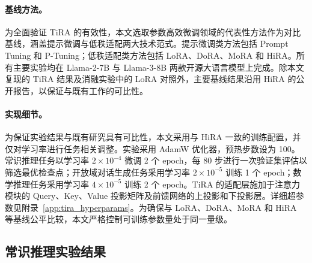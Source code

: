 \documentclass[UTF8,a4paper,11pt]{ctexart}
\begin{document}
\paragraph{基线方法。}
为全面验证 TiRA 的有效性，本文选取参数高效微调领域的代表性方法作为对比基线，涵盖提示微调与低秩适配两大技术范式。提示微调类方法包括 Prompt Tuning 和 P-Tuning；低秩适配类方法包括 LoRA、DoRA、MoRA 和 HiRA。所有主要实验均在 Llama-2-7B\cite{touvron2023llama2} 与 Llama-3-8B\cite{grattafiori2024llama3} 两款开源大语言模型上完成。除本文复现的 TiRA 结果及消融实验中的 LoRA 对照外，主要基线结果沿用 HiRA 的公开报告，以保证与既有工作的可比性。

\paragraph{实现细节。}
为保证实验结果与既有研究具有可比性，本文采用与 HiRA 一致的训练配置，并仅对学习率进行任务相关调整。实验采用 AdamW 优化器，预热步数设为 100。常识推理任务以学习率 $2\times10^{-4}$ 微调 2 个 epoch，每 80 步进行一次验证集评估以筛选最优检查点；开放域对话生成任务采用学习率 $2\times10^{-5}$ 训练 1 个 epoch；数学推理任务采用学习率 $4\times10^{-5}$ 训练 2 个 epoch。TiRA 的适配层施加于注意力模块的 Query、Key、Value 投影矩阵及前馈网络的上投影和下投影层。详细超参数见附录~\ref{app:tira_hyperparams}。为确保与 LoRA、DoRA、MoRA 和 HiRA 等基线公平比较，本文严格控制可训练参数量处于同一量级。

\subsection{常识推理实验结果}
\end{document}
